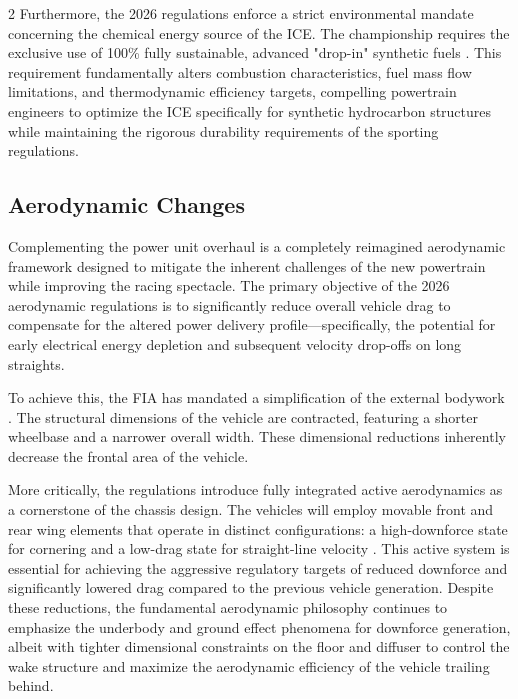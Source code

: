 \begin{multicols}{2}
Furthermore, the 2026 regulations enforce a strict environmental mandate concerning the chemical energy source of the ICE. The championship requires the exclusive use of 100\% fully sustainable, advanced "drop-in" synthetic fuels \cite{FIA_2026_PU_Regulations}. This requirement fundamentally alters combustion characteristics, fuel mass flow limitations, and thermodynamic efficiency targets, compelling powertrain engineers to optimize the ICE specifically for synthetic hydrocarbon structures while maintaining the rigorous durability requirements of the sporting regulations.

\subsection{Aerodynamic Changes}

Complementing the power unit overhaul is a completely reimagined aerodynamic framework designed to mitigate the inherent challenges of the new powertrain while improving the racing spectacle. The primary objective of the 2026 aerodynamic regulations is to significantly reduce overall vehicle drag to compensate for the altered power delivery profile—specifically, the potential for early electrical energy depletion and subsequent velocity drop-offs on long straights.

To achieve this, the FIA has mandated a simplification of the external bodywork \cite{FIA_2026_Chassis_Regulations}. The structural dimensions of the vehicle are contracted, featuring a shorter wheelbase and a narrower overall width. These dimensional reductions inherently decrease the frontal area of the vehicle. 

More critically, the regulations introduce fully integrated active aerodynamics as a cornerstone of the chassis design. The vehicles will employ movable front and rear wing elements that operate in distinct configurations: a high-downforce state for cornering and a low-drag state for straight-line velocity \cite{FIA_2026_Technical_Regulations}. This active system is essential for achieving the aggressive regulatory targets of reduced downforce and significantly lowered drag compared to the previous vehicle generation. Despite these reductions, the fundamental aerodynamic philosophy continues to emphasize the underbody and ground effect phenomena for downforce generation, albeit with tighter dimensional constraints on the floor and diffuser to control the wake structure and maximize the aerodynamic efficiency of the vehicle trailing behind.


\end{multicols}
